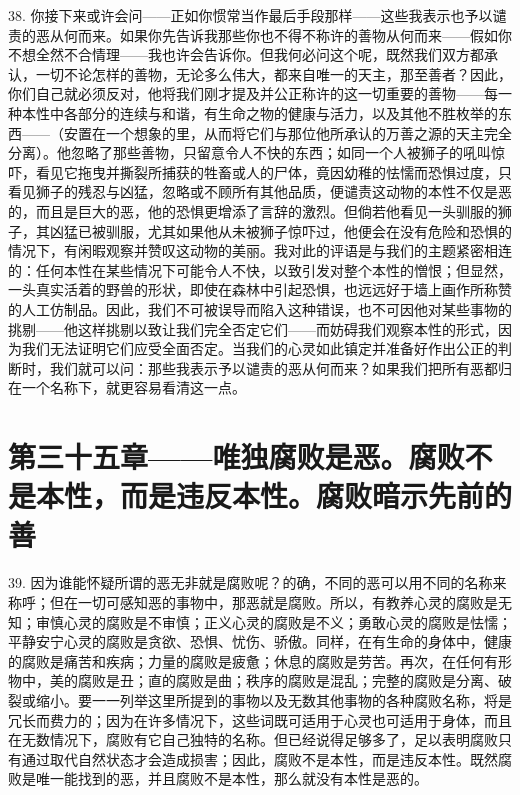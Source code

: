38. 你接下来或许会问——正如你惯常当作最后手段那样——这些我表示也予以谴责的恶从何而来。如果你先告诉我那些你也不得不称许的善物从何而来——假如你不想全然不合情理——我也许会告诉你。但我何必问这个呢，既然我们双方都承认，一切不论怎样的善物，无论多么伟大，都来自唯一的天主，那至善者？因此，你们自己就必须反对，他将我们刚才提及并公正称许的这一切重要的善物——每一种本性中各部分的连续与和谐，有生命之物的健康与活力，以及其他不胜枚举的东西——（安置在一个想象的里，从而将它们与那位他所承认的万善之源的天主完全分离）。他忽略了那些善物，只留意令人不快的东西；如同一个人被狮子的吼叫惊吓，看见它拖曳并撕裂所捕获的牲畜或人的尸体，竟因幼稚的怯懦而恐惧过度，只看见狮子的残忍与凶猛，忽略或不顾所有其他品质，便谴责这动物的本性不仅是恶的，而且是巨大的恶，他的恐惧更增添了言辞的激烈。但倘若他看见一头驯服的狮子，其凶猛已被驯服，尤其如果他从未被狮子惊吓过，他便会在没有危险和恐惧的情况下，有闲暇观察并赞叹这动物的美丽。我对此的评语是与我们的主题紧密相连的：任何本性在某些情况下可能令人不快，以致引发对整个本性的憎恨；但显然，一头真实活着的野兽的形状，即使在森林中引起恐惧，也远远好于墙上画作所称赞的人工仿制品。因此，我们不可被误导而陷入这种错误，也不可因他对某些事物的挑剔——他这样挑剔以致让我们完全否定它们——而妨碍我们观察本性的形式，因为我们无法证明它们应受全面否定。当我们的心灵如此镇定并准备好作出公正的判断时，我们就可以问：那些我表示予以谴责的恶从何而来？如果我们把所有恶都归在一个名称下，就更容易看清这一点。\par


\section{第三十五章——唯独腐败是恶。腐败不是本性，而是违反本性。腐败暗示先前的善}

39. 因为谁能怀疑所谓的恶无非就是腐败呢？的确，不同的恶可以用不同的名称来称呼；但在一切可感知恶的事物中，那恶就是腐败。所以，有教养心灵的腐败是无知；审慎心灵的腐败是不审慎；正义心灵的腐败是不义；勇敢心灵的腐败是怯懦；平静安宁心灵的腐败是贪欲、恐惧、忧伤、骄傲。同样，在有生命的身体中，健康的腐败是痛苦和疾病；力量的腐败是疲惫；休息的腐败是劳苦。再次，在任何有形物中，美的腐败是丑；直的腐败是曲；秩序的腐败是混乱；完整的腐败是分离、破裂或缩小。要一一列举这里所提到的事物以及无数其他事物的各种腐败名称，将是冗长而费力的；因为在许多情况下，这些词既可适用于心灵也可适用于身体，而且在无数情况下，腐败有它自己独特的名称。但已经说得足够多了，足以表明腐败只有通过取代自然状态才会造成损害；因此，腐败不是本性，而是违反本性。既然腐败是唯一能找到的恶，并且腐败不是本性，那么就没有本性是恶的。\par

